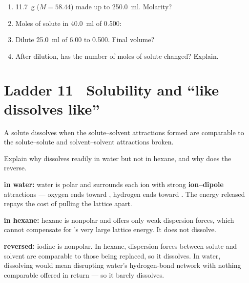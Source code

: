 \documentclass{apchem-worksheet}
\begin{document}
\begin{yourturn}
\begin{enumerate}[leftmargin=*,itemsep=0.5em]
  \item \SI{11.7}{\gram}  ($M = 58.44$) made up to
        \SI{250.0}{\milli\litre}. Molarity? \workspace[1.8cm]
  \item Moles of solute in \SI{40.0}{\milli\litre} of
        \SI{0.500}{\Molar}: \workspace[1.6cm]
  \item Dilute \SI{25.0}{\milli\litre} of \SI{6.00}{\Molar} to
        \SI{0.500}{\Molar}. Final volume? \workspace[1.6cm]
  \item After dilution, has the number of moles of solute changed?
        Explain. \workspace[1.6cm]
\end{enumerate}
\end{yourturn}

\section*{\sffamily Ladder 11 \textbullet\ Solubility and ``like dissolves like''}

A solute dissolves when the solute--solvent attractions formed are
comparable to the solute--solute and solvent--solvent attractions broken.

\begin{workedexample}
Explain why  dissolves readily in water but not in hexane, and
why  does the reverse.

\textbf{ in water:} water is polar and surrounds each ion with
strong \textbf{ion--dipole} attractions --- oxygen ends toward ,
hydrogen ends toward . The energy released repays the cost of
pulling the lattice apart.

\textbf{ in hexane:} hexane is nonpolar and offers only weak
dispersion forces, which cannot compensate for 's very large
lattice energy. It does not dissolve.

\textbf{ reversed:} iodine is nonpolar. In hexane, dispersion
forces between solute and solvent are comparable to those being replaced,
so it dissolves. In water, dissolving would mean disrupting water's
hydrogen-bond network with nothing comparable offered in return --- so it
barely dissolves.
\end{workedexample}
\end{document}
